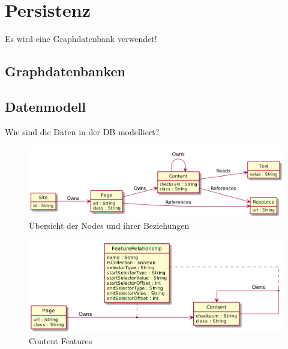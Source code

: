 \section{Persistenz}
    \label{section:solutionDetailsPersistence}
    Es wird eine Graphdatenbank verwendet!

    \subsection{Graphdatenbanken}

    \subsection{Datenmodell}
        Wie sind die Daten in der DB modelliert?

        \begin{figure}
            \centering
            \includegraphics[width=\textwidth]{../resources/db-data-model/nodes.png}
            \caption{Übersicht der Nodes und ihrer Beziehungen}
            \label{image:dbDataModelOverview}
        \end{figure}

        \begin{figure}
            \centering
            \includegraphics[width=\textwidth]{../resources/db-data-model/content-relationship.png}
            \caption{Content Features}
            \label{image:dbDataModelContentRelationship}
        \end{figure}


